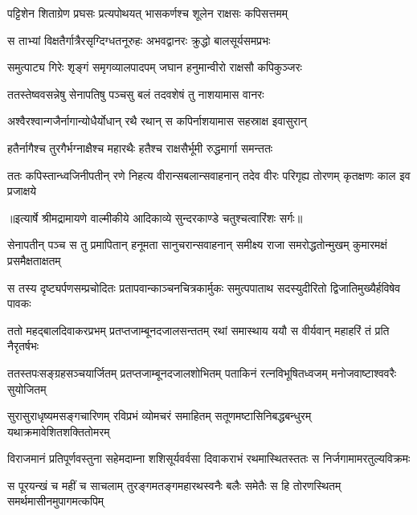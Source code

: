 \twolineshloka
{पट्टिशेन शिताग्रेण प्रघसः प्रत्यपोथयत्}
{भासकर्णश्च शूलेन राक्षसः कपिसत्तमम्} %

\twolineshloka
{स ताभ्यां विक्षतैर्गात्रैरसृग्दिग्धतनूरुहः}
{अभवद्वानरः क्रुद्धो बालसूर्यसमप्रभः} %

\twolineshloka
{समुत्पाट्य गिरेः शृङ्गं समृगव्यालपादपम्}
{जघान हनुमान्वीरो राक्षसौ कपिकुञ्जरः} %

\twolineshloka
{ततस्तेष्ववसन्नेषु सेनापतिषु पञ्चसु}
{बलं तदवशेषं तु नाशयामास वानरः} %

\twolineshloka
{अश्वैरश्वान्गजैर्नागान्योधैर्योधान् रथै रथान्}
{स कपिर्नाशयामास सहस्राक्ष इवासुरान्} %

\twolineshloka
{हतैर्नागैश्च तुरगैर्भग्नाक्षैश्च महारथैः}
{हतैश्च राक्षसैर्भूमी रुद्धमार्गा समन्ततः} %

\fourlineindentedshloka
{ततः कपिस्तान्ध्वजिनीपतीन् रणे}
{निहत्य वीरान्सबलान्सवाहनान्}
{तदेव वीरः परिगृह्य तोरणम्}
{कृतक्षणः काल इव प्रजाक्षये} %


{॥इत्यार्षे श्रीमद्रामायणे वाल्मीकीये आदिकाव्ये सुन्दरकाण्डे चतुश्चत्वारिंशः सर्गः॥}


\fourlineindentedshloka
{सेनापतीन् पञ्च स तु प्रमापितान्}
{हनूमता सानुचरान्सवाहनान्}
{समीक्ष्य राजा समरोद्धतोन्मुखम्}
{कुमारमक्षं प्रसमैक्षताक्षतम्} %

\fourlineindentedshloka
{स तस्य दृष्ट्यर्पणसम्प्रचोदितः}
{प्रतापवान्काञ्चनचित्रकार्मुकः}
{समुत्पपाताथ सदस्युदीरितो}
{द्विजातिमुख्यैर्हविषेव पावकः} %

\fourlineindentedshloka
{ततो महद्बालदिवाकरप्रभम्}
{प्रतप्तजाम्बूनदजालसन्ततम्}
{रथां समास्थाय ययौ स वीर्यवान्}
{महाहरिं तं प्रति नैरृतर्षभः} %

\fourlineindentedshloka
{ततस्तपःसङ्ग्रहसञ्चयार्जितम्}
{प्रतप्तजाम्बूनदजालशोभितम्}
{पताकिनं रत्नविभूषितध्वजम्}
{मनोजवाष्टाश्ववरैः सुयोजितम्} %

\fourlineindentedshloka
{सुरासुराधृष्यमसङ्गचारिणम्}
{रविप्रभं व्योमचरं समाहितम्}
{सतूणमष्टासिनिबद्धबन्धुरम्}
{यथाक्रमावेशितशक्तितोमरम्} %

\fourlineindentedshloka
{विराजमानं प्रतिपूर्णवस्तुना}
{सहेमदाम्ना शशिसूर्यवर्वसा}
{दिवाकराभं रथमास्थितस्ततः}
{स निर्जगामामरतुल्यविक्रमः} %

\fourlineindentedshloka
{स पूरयन्खं च महीं च साचलाम्}
{तुरङ्गमतङ्गमहारथस्वनैः}
{बलैः समेतैः स हि तोरणस्थितम्}
{समर्थमासीनमुपागमत्कपिम्} %

